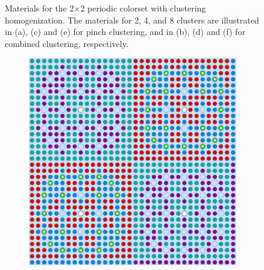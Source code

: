 \begin{figure}[h!]
\begin{subfigure}{0.48\textwidth}
  \caption{}
  \label{fig:chap10-assm-2x2-combined-8}
\end{subfigure}
\caption[Materials for the 2$\times$2 periodic colorset with clustering homogenization]{Materials for the 2$\times$2 periodic colorset with clustering homogenization. The materials for 2, 4, and 8 clusters are illustrated in (a), (c) and (e) for pinch clustering, and in (b), (d) and (f) for combined clustering, respectively.}
\label{fig:chap10-2x2-geometries}
\end{figure}

\clearpage

\begin{figure}[h!]
\centering
\begin{subfigure}{0.48\textwidth}
  \centering
  \includegraphics[width=0.9\linewidth]{figures/unsupervised/geometries/with-features/2-clusters/pinch/reflector}
  \caption{}
  \label{fig:chap10-reflector-pinch-2}
\end{subfigure}%
\begin{subfigure}{0.48\textwidth}
  \centering

\end{subfigure}
\end{figure}

